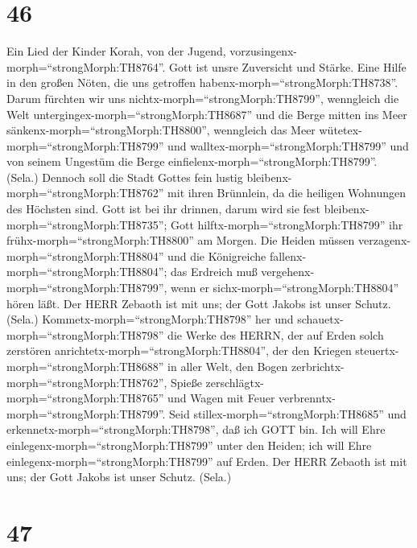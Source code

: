 \hypertarget{section-45}{%
\section{46}\label{section-45}}

 Ein Lied der Kinder Korah, von der Jugend,
vorzusingenx-morph=``strongMorph:TH8764''. Gott ist unsre Zuversicht und
Stärke. Eine Hilfe in den großen Nöten, die uns getroffen
habenx-morph=``strongMorph:TH8738''.  Darum fürchten wir uns
nichtx-morph=``strongMorph:TH8799'', wenngleich die Welt
untergingex-morph=``strongMorph:TH8687'' und die Berge mitten ins Meer
sänkenx-morph=``strongMorph:TH8800'',  wenngleich das Meer
wütetex-morph=``strongMorph:TH8799'' und
walltex-morph=``strongMorph:TH8799'' und von seinem Ungestüm die Berge
einfielenx-morph=``strongMorph:TH8799''. (Sela.)  Dennoch
soll die Stadt Gottes fein lustig bleibenx-morph=``strongMorph:TH8762''
mit ihren Brünnlein, da die heiligen Wohnungen des Höchsten sind.
 Gott ist bei ihr drinnen, darum wird sie fest
bleibenx-morph=``strongMorph:TH8735''; Gott
hilftx-morph=``strongMorph:TH8799'' ihr
frühx-morph=``strongMorph:TH8800'' am Morgen.  Die Heiden
müssen verzagenx-morph=``strongMorph:TH8804'' und die Königreiche
fallenx-morph=``strongMorph:TH8804''; das Erdreich muß
vergehenx-morph=``strongMorph:TH8799'', wenn er
sichx-morph=``strongMorph:TH8804'' hören läßt.  Der HERR
Zebaoth ist mit uns; der Gott Jakobs ist unser Schutz. (Sela.)
 Kommetx-morph=``strongMorph:TH8798'' her und
schauetx-morph=``strongMorph:TH8798'' die Werke des HERRN, der auf Erden
solch zerstören anrichtetx-morph=``strongMorph:TH8804'', 
der den Kriegen steuertx-morph=``strongMorph:TH8688'' in aller Welt, den
Bogen zerbrichtx-morph=``strongMorph:TH8762'', Spieße
zerschlägtx-morph=``strongMorph:TH8765'' und Wagen mit Feuer
verbrenntx-morph=``strongMorph:TH8799''.  Seid
stillex-morph=``strongMorph:TH8685'' und
erkennetx-morph=``strongMorph:TH8798'', daß ich GOTT bin. Ich will Ehre
einlegenx-morph=``strongMorph:TH8799'' unter den Heiden; ich will Ehre
einlegenx-morph=``strongMorph:TH8799'' auf Erden.  Der HERR
Zebaoth ist mit uns; der Gott Jakobs ist unser Schutz. (Sela.)

\hypertarget{section-46}{%
\section{47}\label{section-46}}

